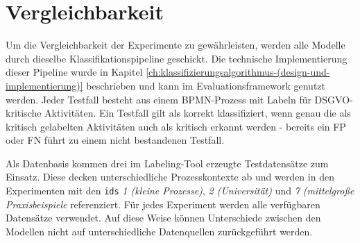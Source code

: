 \section{Vergleichbarkeit}\label{sec:einheitliche-klassifizierungspipeline-und-datensatze}

Um die Vergleichbarkeit der Experimente zu gewährleisten, werden alle Modelle durch dieselbe Klassifikationspipeline geschickt. Die technische Implementierung dieser Pipeline wurde in Kapitel \ref{ch:klassifizierungsalgorithmus-(design-und-implementierung)} beschrieben und kann im Evaluationsframework genutzt werden. Jeder Testfall besteht aus einem \ac{BPMN}-Prozess mit Labeln für \ac{DSGVO}-kritische Aktivitäten. Ein Testfall gilt als korrekt klassifiziert, wenn genau die als kritisch gelabelten Aktivitäten auch als kritisch erkannt werden - bereits ein \ac{FP} oder \ac{FN} führt zu einem nicht bestandenen Testfall.

Als Datenbasis kommen drei im Labeling-Tool erzeugte Testdatensätze zum Einsatz. Diese decken unterschiedliche Prozesskontexte ab und werden in den Experimenten mit den \texttt{ids} \emph{1 (kleine Prozesse)}, \emph{2 (Universität)} und \emph{7 (mittelgroße Praxisbeispiele} referenziert. Für jedes Experiment werden alle verfügbaren Datensätze verwendet. Auf diese Weise können Unterschiede zwischen den Modellen nicht auf unterschiedliche Datenquellen zurückgeführt werden.